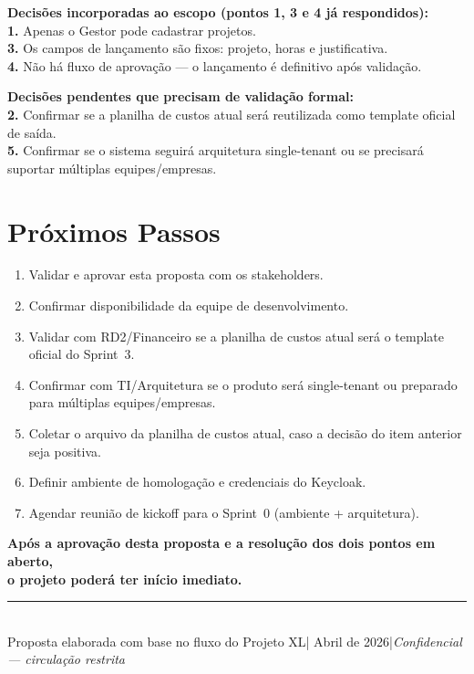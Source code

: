 \documentclass[12pt,a4paper]{article}
\begin{document}
\vspace{0.6em}
\begin{caixacinza}
  \textbf{Decisões incorporadas ao escopo (pontos 1, 3 e 4 já respondidos):}\\[6pt]
  \textbf{1.} Apenas o Gestor pode cadastrar projetos.\\[2pt]
  \textbf{3.} Os campos de lançamento são fixos: projeto, horas e justificativa.\\[2pt]
  \textbf{4.} Não há fluxo de aprovação — o lançamento é definitivo após validação.
\end{caixacinza}

\vspace{0.6em}
\begin{caixacinza}
  \textbf{Decisões pendentes que precisam de validação formal:}\\[6pt]
  \textbf{2.} Confirmar se a planilha de custos atual será reutilizada como template oficial de saída.\\[2pt]
  \textbf{5.} Confirmar se o sistema seguirá arquitetura single-tenant ou se precisará suportar múltiplas equipes/empresas.
\end{caixacinza}

\section{Próximos Passos}

\begin{enumerate}[leftmargin=1.8em]
  \item Validar e aprovar esta proposta com os stakeholders.
  \item Confirmar disponibilidade da equipe de desenvolvimento.
  \item Validar com RD2/Financeiro se a planilha de custos atual será o template oficial do Sprint~3.
  \item Confirmar com TI/Arquitetura se o produto será single-tenant ou preparado para múltiplas equipes/empresas.
  \item Coletar o arquivo da planilha de custos atual, caso a decisão do item anterior seja positiva.
  \item Definir ambiente de homologação e credenciais do Keycloak.
  \item Agendar reunião de kickoff para o Sprint~0 (ambiente + arquitetura).
\end{enumerate}

\vspace{1em}
\begin{caixaazul}
  \centering
  \textbf{Após a aprovação desta proposta e a resolução dos dois pontos em aberto,\\
  o projeto poderá ter início imediato.}
\end{caixaazul}

\vspace{2em}
\noindent\rule{\linewidth}{0.4pt}\\[0.4em]
{\small Proposta elaborada com base no fluxo do Projeto XL\enspace|\enspace
Abril de 2026\enspace|\enspace\textit{Confidencial — circulação restrita}}
\end{document}
